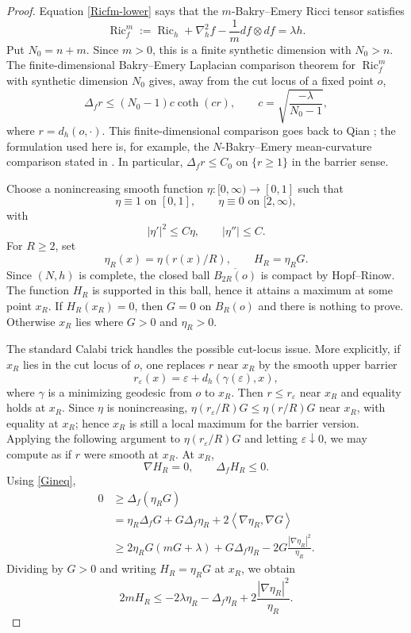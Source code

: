 \documentclass[11pt]{amsart}
\numberwithin{equation}{section}
\DeclareMathOperator{\Ric}{Ric}
\newcommand{\Hess}{\nabla^2}
\newcommand{\ip}[2]{\left\langle #1,#2\right\rangle}
\newcommand{\norm}[1]{\left|#1\right|}
\begin{document}
\begin{proof}
Equation \eqref{Ricfm-lower} says that the $m$-Bakry--Emery Ricci tensor satisfies
$$
        \Ric_f^m:=\Ric_h+\Hess_h f-\frac1m df\otimes df=\lambda h .
$$
Put $N_0=n+m$.  Since $m>0$, this is a finite synthetic dimension with $N_0>n$.  The finite-dimensional Bakry--Emery Laplacian comparison theorem for $\Ric_f^m$ with synthetic dimension $N_0$ gives, away from the cut locus of a fixed point $o$,
\begin{equation}\label{lap-comp}
        \Delta_f r\leq (N_0-1)c\coth(cr),
        \qquad
        c=\sqrt{\frac{-\lambda}{N_0-1}},
\end{equation}
where $r=d_h(o,\cdot)$.  This finite-dimensional comparison goes back to Qian \cite{Qian}; the formulation used here is, for example, the $N$-Bakry--Emery mean-curvature comparison stated in \cite[Theorem~A.1]{WeiWylie}.  In particular, $\Delta_f r\leq C_0$ on $\{r\geq1\}$ in the barrier sense.

Choose a nonincreasing smooth function $\eta:[0,\infty)\to[0,1]$ such that
$$
        \eta\equiv1\text{ on }[0,1],
        \qquad
        \eta\equiv0\text{ on }[2,\infty),
$$
with
$$
        |\eta'|^2\leq C\eta,
        \qquad
        |\eta''|\leq C .
$$
For $R\geq2$, set
$$
        \eta_R(x)=\eta(r(x)/R),
        \qquad
        H_R=\eta_R G .
$$
Since $(N,h)$ is complete, the closed ball $\overline{B_{2R}(o)}$ is compact by Hopf--Rinow.  The function $H_R$ is supported in this ball, hence it attains a maximum at some point $x_R$.  If $H_R(x_R)=0$, then $G=0$ on $B_R(o)$ and there is nothing to prove.  Otherwise $x_R$ lies where $G>0$ and $\eta_R>0$.

The standard Calabi trick handles the possible cut-locus issue.  More explicitly, if $x_R$ lies in the cut locus of $o$, one replaces $r$ near $x_R$ by the smooth upper barrier
$$
        r_\varepsilon(x)=\varepsilon+d_h(\gamma(\varepsilon),x),
$$
where $\gamma$ is a minimizing geodesic from $o$ to $x_R$.  Then $r\le r_\varepsilon$ near $x_R$ and equality holds at $x_R$.  Since $\eta$ is nonincreasing, $\eta(r_\varepsilon/R)G\le \eta(r/R)G$ near $x_R$, with equality at $x_R$; hence $x_R$ is still a local maximum for the barrier version.  Applying the following argument to $\eta(r_\varepsilon/R)G$ and letting $\varepsilon\downarrow0$, we may compute as if $r$ were smooth at $x_R$.  At $x_R$,
$$
        \nabla H_R=0,
        \qquad
        \Delta_f H_R\leq0 .
$$
Using \eqref{Gineq},
\begin{align*}
0
&\geq \Delta_f(\eta_R G) \\
&=\eta_R\Delta_f G+G\Delta_f\eta_R+2\ip{\nabla\eta_R}{\nabla G} \\
&\geq 2\eta_R G(mG+\lambda)+G\Delta_f\eta_R
      -2G\frac{\norm{\nabla\eta_R}^2}{\eta_R} .
\end{align*}
Dividing by $G>0$ and writing $H_R=\eta_R G$ at $x_R$, we obtain
\begin{equation}\label{HRineq}
        2mH_R
        \leq -2\lambda\eta_R-\Delta_f\eta_R
        +2\frac{\norm{\nabla\eta_R}^2}{\eta_R} .
\end{equation}


\end{proof}
\end{document}
